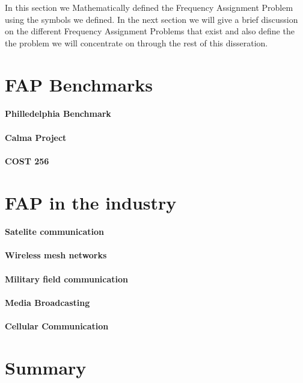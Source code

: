 

In this section we Mathematically defined the Frequency Assignment Problem using the symbols we defined. In the next section we will give a brief discussion on the different Frequency Assignment Problems that exist and also define the the problem we will concentrate on through the rest of this disseration.
\section{FAP Benchmarks}
\paragraph{Philledelphia Benchmark}
\paragraph{Calma Project}
\paragraph{COST 256}
\section{FAP in the industry}
\paragraph{Satelite communication}
\paragraph{Wireless mesh networks}
\paragraph{Military field communication}
\paragraph{Media Broadcasting}
\paragraph{Cellular Communication}
\section{Summary}
